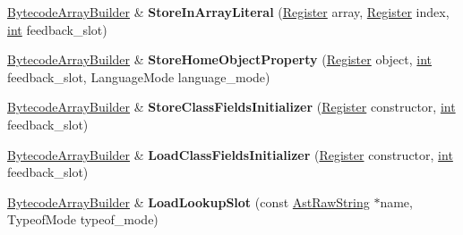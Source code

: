 \begin{DoxyCompactItemize}
\mbox{\label{classv8_1_1internal_1_1interpreter_1_1BytecodeArrayBuilder_a0846ede73825144cfaa117e5fddf3e39}} 
\mbox{\hyperlink{classv8_1_1internal_1_1interpreter_1_1BytecodeArrayBuilder}{Bytecode\+Array\+Builder}} \& {\bfseries Store\+In\+Array\+Literal} (\mbox{\hyperlink{classv8_1_1internal_1_1interpreter_1_1Register}{Register}} array, \mbox{\hyperlink{classv8_1_1internal_1_1interpreter_1_1Register}{Register}} index, \mbox{\hyperlink{classint}{int}} feedback\+\_\+slot)
\item 
\mbox{\label{classv8_1_1internal_1_1interpreter_1_1BytecodeArrayBuilder_a266dedefefb6e45e65632b9310c34a43}} 
\mbox{\hyperlink{classv8_1_1internal_1_1interpreter_1_1BytecodeArrayBuilder}{Bytecode\+Array\+Builder}} \& {\bfseries Store\+Home\+Object\+Property} (\mbox{\hyperlink{classv8_1_1internal_1_1interpreter_1_1Register}{Register}} object, \mbox{\hyperlink{classint}{int}} feedback\+\_\+slot, Language\+Mode language\+\_\+mode)
\item 
\mbox{\label{classv8_1_1internal_1_1interpreter_1_1BytecodeArrayBuilder_aa43f2a8d13e9deb91ed42098383c3615}} 
\mbox{\hyperlink{classv8_1_1internal_1_1interpreter_1_1BytecodeArrayBuilder}{Bytecode\+Array\+Builder}} \& {\bfseries Store\+Class\+Fields\+Initializer} (\mbox{\hyperlink{classv8_1_1internal_1_1interpreter_1_1Register}{Register}} constructor, \mbox{\hyperlink{classint}{int}} feedback\+\_\+slot)
\item 
\mbox{\label{classv8_1_1internal_1_1interpreter_1_1BytecodeArrayBuilder_a1e16f2f3e457f4c61b4d7bff72dc1f6d}} 
\mbox{\hyperlink{classv8_1_1internal_1_1interpreter_1_1BytecodeArrayBuilder}{Bytecode\+Array\+Builder}} \& {\bfseries Load\+Class\+Fields\+Initializer} (\mbox{\hyperlink{classv8_1_1internal_1_1interpreter_1_1Register}{Register}} constructor, \mbox{\hyperlink{classint}{int}} feedback\+\_\+slot)
\item 
\mbox{\label{classv8_1_1internal_1_1interpreter_1_1BytecodeArrayBuilder_a003cef49d77e9f8d35b2e78209fa4e68}} 
\mbox{\hyperlink{classv8_1_1internal_1_1interpreter_1_1BytecodeArrayBuilder}{Bytecode\+Array\+Builder}} \& {\bfseries Load\+Lookup\+Slot} (const \mbox{\hyperlink{classv8_1_1internal_1_1AstRawString}{Ast\+Raw\+String}} $\ast$name, Typeof\+Mode typeof\+\_\+mode)

\end{DoxyCompactItemize}
